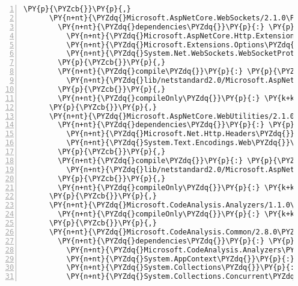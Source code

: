 \begin{Verbatim}[commandchars=\\\{\},numbers=left,firstnumber=1,stepnumber=1,numberblanklines=0]
      \PY{p}{\PYZcb{}}\PY{p}{,}
      \PY{n+nt}{\PYZdq{}Microsoft.AspNetCore.WebSockets/2.1.0\PYZhy{}rc1\PYZhy{}final\PYZdq{}}\PY{p}{:} \PY{p}{\PYZob{}}
        \PY{n+nt}{\PYZdq{}dependencies\PYZdq{}}\PY{p}{:} \PY{p}{\PYZob{}}
          \PY{n+nt}{\PYZdq{}Microsoft.AspNetCore.Http.Extensions\PYZdq{}}\PY{p}{:} \PY{l+s+s2}{\PYZdq{}2.1.0\PYZhy{}rc1\PYZhy{}final\PYZdq{}}\PY{p}{,}
          \PY{n+nt}{\PYZdq{}Microsoft.Extensions.Options\PYZdq{}}\PY{p}{:} \PY{l+s+s2}{\PYZdq{}2.1.0\PYZhy{}rc1\PYZhy{}final\PYZdq{}}\PY{p}{,}
          \PY{n+nt}{\PYZdq{}System.Net.WebSockets.WebSocketProtocol\PYZdq{}}\PY{p}{:} \PY{l+s+s2}{\PYZdq{}4.5.0\PYZhy{}rc1\PYZdq{}}
        \PY{p}{\PYZcb{}}\PY{p}{,}
        \PY{n+nt}{\PYZdq{}compile\PYZdq{}}\PY{p}{:} \PY{p}{\PYZob{}}
          \PY{n+nt}{\PYZdq{}lib/netstandard2.0/Microsoft.AspNetCore.WebSockets.dll\PYZdq{}}\PY{p}{:} \PY{p}{\PYZob{}}\PY{p}{\PYZcb{}}
        \PY{p}{\PYZcb{}}\PY{p}{,}
        \PY{n+nt}{\PYZdq{}compileOnly\PYZdq{}}\PY{p}{:} \PY{k+kc}{true}
      \PY{p}{\PYZcb{}}\PY{p}{,}
      \PY{n+nt}{\PYZdq{}Microsoft.AspNetCore.WebUtilities/2.1.0\PYZhy{}rc1\PYZhy{}final\PYZdq{}}\PY{p}{:} \PY{p}{\PYZob{}}
        \PY{n+nt}{\PYZdq{}dependencies\PYZdq{}}\PY{p}{:} \PY{p}{\PYZob{}}
          \PY{n+nt}{\PYZdq{}Microsoft.Net.Http.Headers\PYZdq{}}\PY{p}{:} \PY{l+s+s2}{\PYZdq{}2.1.0\PYZhy{}rc1\PYZhy{}final\PYZdq{}}\PY{p}{,}
          \PY{n+nt}{\PYZdq{}System.Text.Encodings.Web\PYZdq{}}\PY{p}{:} \PY{l+s+s2}{\PYZdq{}4.5.0\PYZhy{}rc1\PYZdq{}}
        \PY{p}{\PYZcb{}}\PY{p}{,}
        \PY{n+nt}{\PYZdq{}compile\PYZdq{}}\PY{p}{:} \PY{p}{\PYZob{}}
          \PY{n+nt}{\PYZdq{}lib/netstandard2.0/Microsoft.AspNetCore.WebUtilities.dll\PYZdq{}}\PY{p}{:} \PY{p}{\PYZob{}}\PY{p}{\PYZcb{}}
        \PY{p}{\PYZcb{}}\PY{p}{,}
        \PY{n+nt}{\PYZdq{}compileOnly\PYZdq{}}\PY{p}{:} \PY{k+kc}{true}
      \PY{p}{\PYZcb{}}\PY{p}{,}
      \PY{n+nt}{\PYZdq{}Microsoft.CodeAnalysis.Analyzers/1.1.0\PYZdq{}}\PY{p}{:} \PY{p}{\PYZob{}}
        \PY{n+nt}{\PYZdq{}compileOnly\PYZdq{}}\PY{p}{:} \PY{k+kc}{true}
      \PY{p}{\PYZcb{}}\PY{p}{,}
      \PY{n+nt}{\PYZdq{}Microsoft.CodeAnalysis.Common/2.8.0\PYZhy{}beta3\PYZdq{}}\PY{p}{:} \PY{p}{\PYZob{}}
        \PY{n+nt}{\PYZdq{}dependencies\PYZdq{}}\PY{p}{:} \PY{p}{\PYZob{}}
          \PY{n+nt}{\PYZdq{}Microsoft.CodeAnalysis.Analyzers\PYZdq{}}\PY{p}{:} \PY{l+s+s2}{\PYZdq{}1.1.0\PYZdq{}}\PY{p}{,}
          \PY{n+nt}{\PYZdq{}System.AppContext\PYZdq{}}\PY{p}{:} \PY{l+s+s2}{\PYZdq{}4.3.0\PYZdq{}}\PY{p}{,}
          \PY{n+nt}{\PYZdq{}System.Collections\PYZdq{}}\PY{p}{:} \PY{l+s+s2}{\PYZdq{}4.3.0\PYZdq{}}\PY{p}{,}
          \PY{n+nt}{\PYZdq{}System.Collections.Concurrent\PYZdq{}}\PY{p}{:} \PY{l+s+s2}{\PYZdq{}4.3.0\PYZdq{}}\PY{p}{,}

\end{Verbatim}

